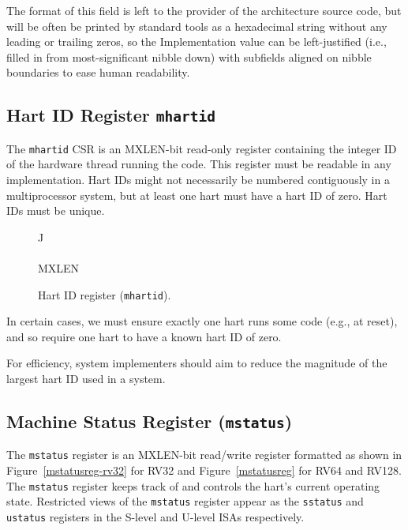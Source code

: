 \begin{commentary}
The format of this field is left to the provider of the architecture
source code, but will be often be printed by standard tools as a
hexadecimal string without any leading or trailing zeros, so the
Implementation value can be left-justified (i.e., filled in from
most-significant nibble down) with subfields aligned on nibble
boundaries to ease human readability.
\end{commentary}

\subsection{Hart ID Register {\tt mhartid}}

The {\tt mhartid} CSR is an MXLEN-bit read-only register
containing the integer ID of the hardware thread running the code.
This register must be readable in any implementation.  Hart IDs might
not necessarily be numbered contiguously in a multiprocessor system,
but at least one hart must have a hart ID of zero.  Hart IDs must be unique.

\begin{figure*}[h!]
{\footnotesize
\begin{center}
\begin{tabular}{J}
 \\
\hline
{}\\
\hline
MXLEN \\
\end{tabular}
\end{center}
}
\vspace{-0.1in}
\caption{Hart ID register ({\tt mhartid}).}
\label{mhartidreg}
\end{figure*}


\begin{commentary}
In certain cases, we must ensure exactly one hart runs some code
(e.g., at reset), and so require one hart to have a known hart ID of
zero.

For efficiency, system implementers should aim to reduce the magnitude
of the largest hart ID used in a system.
\end{commentary}

\subsection{Machine Status Register ({\tt mstatus})}

The {\tt mstatus} register is an MXLEN-bit read/write register
formatted as shown in Figure~\ref{mstatusreg-rv32} for RV32 and
Figure~\ref{mstatusreg} for RV64 and RV128.  The {\tt mstatus}
register keeps track of and controls the hart's current operating
state.  Restricted views of the {\tt mstatus} register appear as the
{\tt sstatus} and {\tt ustatus} registers in the S-level and U-level
ISAs respectively.

